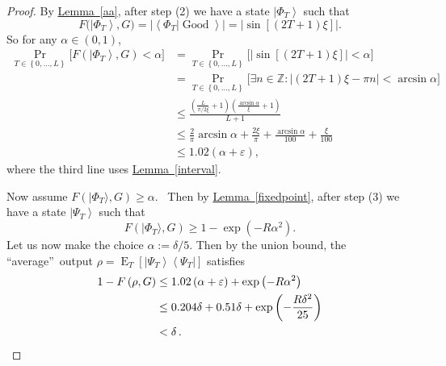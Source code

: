\documentclass[10pt]{article}
\theoremstyle{definition}
\numberwithin{equation}{section}
\newcommand{\expref}[2]{\texorpdfstring{\hyperref[#2]{#1~\ref{#2}}}{#1~\ref{#2}}}
\begin{document}
\begin{proof}
By \expref{Lemma}{aa}, after step (2) we have a state $\left\vert \Phi
_{T}\right\rangle $ such that
\[
F\bigl(  \left\vert \Phi_{T}\right\rangle ,G\bigr)  =\bigl\vert \left\langle
\Phi_{T}|\operatorname*{Good}\right\rangle \bigr\vert =\bigl\vert \sin\left[
\left(  2T+1\right)  \xi\right]  \bigr\vert .
\]
So for any $\alpha\in\left(  0,1\right)  $,%
\begin{align*}
\Pr_{T\in\left\{  0,\ldots,L\right\}  }\bigl[  F\left(  \left\vert \Phi
_{T}\right\rangle ,G\right)  <\alpha\bigr]   &  =\Pr_{T\in\left\{
0,\ldots,L\right\}  }\bigl[  \left\vert \sin\left[  \left(  2T+1\right)
\xi\right]  \right\vert <\alpha\bigr]  \\
&  =\Pr_{T\in\left\{  0,\ldots,L\right\}  }\bigl[  \exists n\in\mathbb{Z}%
:\left\vert \left(  2T+1\right)  \xi-\pi n\right\vert <\arcsin\alpha\bigr]
\\
&  \leq\frac{\left(  \frac{L}{\pi/2\xi}+1\right)  \left(  \frac{\arcsin\alpha
}{\xi}+1\right)  }{L+1}\\
&  \leq\frac{2}{\pi}\arcsin\alpha+\frac{2\xi}{\pi}+\frac{\arcsin\alpha}%
{100}+\frac{\xi}{100}\\[1ex]
&  \leq1.02\left(  \alpha+\varepsilon\right)  ,
\end{align*}
where the third line uses \expref{Lemma}{interval}.

Now assume $F(\vert \Phi_{T}\rangle ,G)  \geq\alpha$.
\ Then by \expref{Lemma}{fixedpoint}, after step (3) we have a state $\left\vert
\Psi_{T}\right\rangle $ such that%
\[
F(\vert \Phi_{T}\rangle ,G)  \geq1-\exp\left(
-R\alpha^{2}\right)  .
\]
Let us now make the choice $\alpha:=\delta/5$. Then by the union bound, the
\textquotedblleft average\textquotedblright\ output $\rho=\operatorname*{E}%
_{T}\left[  \left\vert \Psi_{T}\right\rangle \left\langle \Psi_{T}\right\vert
\right]  $ satisfies%
\begin{align*}
1-F\left(  \rho,G\right)   &  \leq1.02\left(  \alpha+\varepsilon\right)
+\exp\left(  -R\alpha^{2}\right) \\
&  \leq0.204\delta+0.51\delta+\exp\left(  -\frac{R\delta^{2}}{25}\right) \\
&  <\delta\,.\qedhere
\end{align*}
\end{proof}
\setcounter{section}{3}\setcounter{subsection}{2}\setcounter{theorem}{1}
\end{document}
